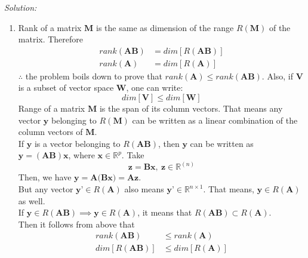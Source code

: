 \documentclass[fleqn]{article}
\newenvironment{solution}
    {\textit{Solution:}}
    {}
\begin{document}
\begin{solution}
    \begin{enumerate}[label=(\alph*)]
        \item Rank of a matrix $\textbf{M}$ is the same as dimension of the range $R(\textbf{M})$ of the matrix.
    Therefore
    \begin{equation*}
        \begin{split}
            rank(\textbf{AB}) &= dim[R(\textbf{AB})]\\
            rank(\textbf{A}) &= dim[R(\textbf{A})]
        \end{split}
    \end{equation*}
    $\therefore$ the problem boils down to prove that $rank(\textbf{A}) \leq rank(\textbf{AB})$. Also, if $\textbf{V}$ is a subset of vector space $\textbf{W}$, one can write:
    \begin{equation*}
        dim[\textbf{V}] \leq dim[\textbf{W}]
    \end{equation*}
    Range of a matrix $\textbf{M}$ is the span of its column vectors. That means any vector $\textbf{y}$ belonging to $R(\textbf{M})$ can be written as a linear combination of the column vectors of $\textbf{M}$.\\
    If $\textbf{y}$ is a vector belonging to $R(\textbf{AB})$, then $\textbf{y}$ can be written as $\textbf{y} = (\textbf{AB})\textbf{x}$, where $\textbf{x} \in \mathbb{R}^{p}$. Take
    \begin{equation*}
        \textbf{z} = \textbf{Bx},~\textbf{z} \in \mathbb{R}^{(n)}
    \end{equation*}
    Then, we have $\textbf{y} = \textbf{A(Bx)} = \textbf{Az}$.\\
    But any vector $\textbf{y'} \in R(\textbf{A})$ also means $\textbf{y'} \in \mathbb{R}^{n \times 1}$. That means, $\textbf{y} \in R(\textbf{A})$ as well.\\
     If $\textbf{y} \in R(\textbf{AB}) \implies \textbf{y} \in R(\textbf{A})$, it means that $R(\textbf{AB}) \subset R(\textbf{A})$.\\
    Then it follows from above that 
    \begin{equation*}
        \begin{split}
            rank(\textbf{A}\textbf{B}) &\leq rank(\textbf{A})\\
            dim[R(\textbf{A}\textbf{B})] &\leq dim[R(\textbf{A})]
        \end{split}
    \end{equation*}

\end{enumerate}
\end{solution}
\end{document}
